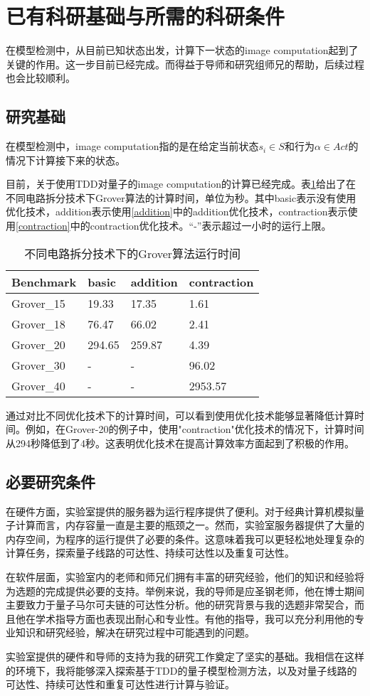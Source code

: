 \section{已有科研基础与所需的科研条件}
在模型检测中，从目前已知状态出发，计算下一状态的image computation起到了关键的作用。这一步目前已经完成。而得益于导师和研究组师兄的帮助，后续过程也会比较顺利。
\subsection{研究基础}
在模型检测中，image computation指的是在给定当前状态$s_i\in S$和行为$\alpha\in Act$的情况下计算接下来的状态。

目前，关于使用TDD对量子的image computation的计算已经完成。表\ref{table:time}给出了在不同电路拆分技术下Grover算法的计算时间，单位为秒。其中basic表示没有使用优化技术，addition表示使用\ref{addition}中的addition优化技术，contraction表示使用\ref{contraction}中的contraction优化技术。“-”表示超过一小时的运行上限。

\begin{table}[!htbp]
    \centering
    \begin{tabular}{@{}llll@{}}
        \toprule
        Benchmark  & basic  & addition & contraction \\ \midrule
        Grover\_15 & 19.33  & 17.35    & 1.61        \\
        Grover\_18 & 76.47  & 66.02    & 2.41        \\
        Grover\_20 & 294.65 & 259.87   & 4.39        \\
        Grover\_30 & -      & -        & 96.02       \\
        Grover\_40 & -      & -        & 2953.57     \\ \bottomrule
    \end{tabular}
    \caption{不同电路拆分技术下的Grover算法运行时间}
    \label{table:time}
\end{table}

通过对比不同优化技术下的计算时间，可以看到使用优化技术能够显著降低计算时间。例如，在Grover-20的例子中，使用"contraction"优化技术的情况下，计算时间从294秒降低到了4秒。这表明优化技术在提高计算效率方面起到了积极的作用。

\subsection{必要研究条件}
在硬件方面，实验室提供的服务器为运行程序提供了便利。对于经典计算机模拟量子计算而言，内存容量一直是主要的瓶颈之一。然而，实验室服务器提供了大量的内存空间，为程序的运行提供了必要的条件。这意味着我可以更轻松地处理复杂的计算任务，探索量子线路的可达性、持续可达性以及重复可达性。

在软件层面，实验室内的老师和师兄们拥有丰富的研究经验，他们的知识和经验将为选题的完成提供必要的支持。举例来说，我的导师是应圣钢老师，他在博士期间主要致力于量子马尔可夫链的可达性分析。他的研究背景与我的选题非常契合，而且他在学术指导方面也表现出耐心和专业性。有他的指导，我可以充分利用他的专业知识和研究经验，解决在研究过程中可能遇到的问题。

实验室提供的硬件和导师的支持为我的研究工作奠定了坚实的基础。我相信在这样的环境下，我将能够深入探索基于TDD的量子模型检测方法，以及对量子线路的可达性、持续可达性和重复可达性进行计算与验证。
